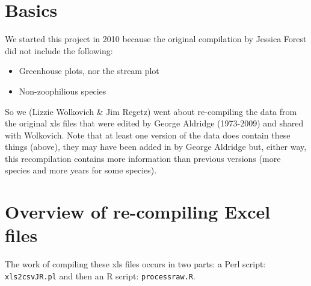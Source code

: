 \documentclass[11pt,a4paper]{article}
\begin{document}
\newpage
\section{Basics}
We started this project in 2010 because the original compilation by Jessica Forest did not include the following:
\begin{itemize}
\item Greenhouse plots, nor the stream plot
\item Non-zoophilious species
\end{itemize}
So we (Lizzie Wolkovich \& Jim Regetz) went about re-compiling the
data from the original xls files that were edited by George Aldridge
(1973-2009) and shared with Wolkovich. Note that at least one version
of the data does contain these things (above), they may have been
added in by George Aldridge but, either way, this recompilation
contains more information than previous versions (more species and more years for some species). 

\section{Overview of re-compiling Excel files}
The work of compiling these xls files occurs in two parts: a Perl script: \verb|xls2csvJR.pl| and then an R script: \verb|processraw.R|.\\
\end{document}
